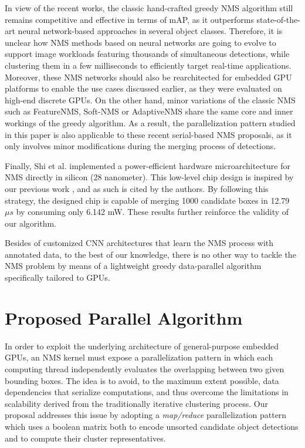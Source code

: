 In view of the recent works, the classic hand-crafted greedy NMS algorithm still remains competitive and effective in terms of mAP, as it outperforms state-of-the-art neural network-based 
approaches in several object classes. Therefore, it is unclear how NMS methods based on neural networks are going to evolve to support image workloads featuring thousands of 
simultaneous detections, while clustering them in a few milliseconds to efficiently target real-time applications. Moreover, these NMS networks should also be rearchitected for embedded 
GPU platforms to enable the use cases discussed earlier, as they were evaluated on high-end discrete GPUs. On the other hand, minor variations of the classic NMS such 
as FeatureNMS, Soft-NMS or AdaptiveNMS share the same core and inner workings of the greedy algorithm. As a result, the parallelization pattern studied in this paper is also 
applicable to these recent serial-based NMS proposals, as it only involves minor modifications during the merging process of detections.

Finally, Shi et al.\cite{shi2019fast} implemented a power-efficient hardware microarchitecture for NMS directly in silicon (28 nanometer). This low-level chip design is inspired by 
our previous work \cite{oro2016work}, and as such is cited by the authors. By following this strategy, the designed chip is capable of merging 1000 candidate boxes in 12.79 $\mu s$ by consuming only 6.142 mW. These results further reinforce the validity of our algorithm. 

Besides of customized CNN architectures that learn the NMS process with annotated data, to the best of our knowledge, there is no other way to tackle the NMS problem by means of a 
lightweight greedy data-parallel algorithm specifically tailored to GPUs.


\section{Proposed Parallel Algorithm}
\label{sec:impl}

In order to exploit the underlying architecture of general-purpose embedded GPUs, an NMS kernel must expose a parallelization pattern in which each computing thread 
independently evaluates the overlapping between two given bounding boxes. The idea is to avoid, to the maximum extent possible, data dependencies that serialize computations, and 
thus overcome the limitations in scalability derived from the traditionally iterative clustering process. Our proposal addresses this issue by adopting a \emph{map/reduce} 
parallelization pattern which uses a boolean matrix both to encode unsorted candidate object detections and to compute their cluster representatives.

